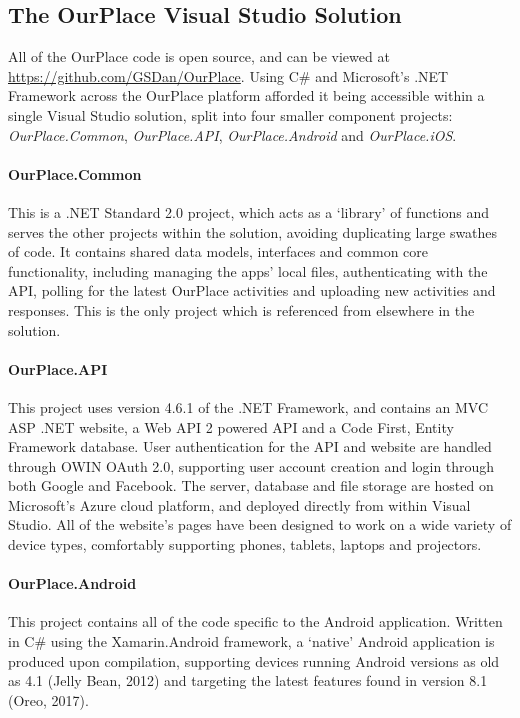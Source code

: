 \subsection{The OurPlace Visual Studio Solution}
\label{sec:OurPlaceSolution}
All of the OurPlace code is open source, and can be viewed at \url{https://github.com/GSDan/OurPlace}. Using C\# and Microsoft's .NET Framework across the OurPlace platform afforded it being accessible within a single Visual Studio solution, split into four smaller component projects: \textit{OurPlace.Common}, \textit{OurPlace.API}, \textit{OurPlace.Android} and \textit{OurPlace.iOS}.

\paragraph{OurPlace.Common}
This is a .NET Standard 2.0 project, which acts as a `library' of functions and serves the other projects within the solution, avoiding duplicating large swathes of code. It contains shared data models, interfaces and common core functionality, including managing the apps' local files, authenticating with the API, polling for the latest OurPlace activities and uploading new activities and responses. This is the only project which is referenced from elsewhere in the solution.

\paragraph{OurPlace.API}
This project uses version 4.6.1 of the .NET Framework, and contains an MVC ASP .NET website, a Web API 2 powered API and a Code First, Entity Framework database. User authentication for the API and website are handled through OWIN OAuth 2.0, supporting user account creation and login through both Google and Facebook. The server, database and file storage are hosted on Microsoft's Azure cloud platform, and deployed directly from within Visual Studio. All of the website's pages have been designed to work on a wide variety of device types, comfortably supporting phones, tablets, laptops and projectors.

\paragraph{OurPlace.Android}
This project contains all of the code specific to the Android application. Written in C\# using the Xamarin.Android framework, a `native' Android application is produced upon compilation, supporting devices running Android versions as old as 4.1 (Jelly Bean, 2012) and targeting the latest features found in version 8.1 (Oreo, 2017).

